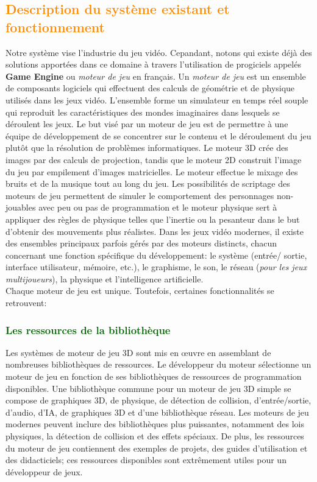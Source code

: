 \documentclass[ebook, 8pt, oneside, openany]{memoir}
\begin{document}
	\subsection{\textcolor{darkorange}{Description du système existant et fonctionnement}}
	Notre système vise l'industrie du jeu vidéo. Cepandant, notons qui existe déjà des solutions apportées
	dans ce domaine à travers l'utilisation de progiciels appelés \textbf{Game Engine} ou \emph{moteur de
	jeu} en français. Un \textit{moteur de jeu} est un ensemble de composants logiciels qui effectuent des 
	calculs de géométrie et de physique utilisés dans les jeux vidéo. L'ensemble forme un simulateur en 
	temps réel souple qui reproduit les caractéristiques des mondes imaginaires dans lesquels se déroulent 
	les jeux. Le but visé par un moteur de jeu est de permettre à une équipe de développement de se
	concentrer sur le contenu et le déroulement du jeu plutôt que la résolution de problèmes informatiques.
	Le moteur 3D crée des images par des calculs de projection, tandis que le moteur 2D construit l'image du 
	jeu par empilement d'images matricielles. Le moteur effectue le mixage des bruits et de la musique tout 
	au long du jeu. Les possibilités de scriptage des moteurs de jeu permettent de simuler le comportement
	des personnages non-jouables avec peu ou pas de programmation et le moteur physique sert à appliquer des 
	règles de physique telles que l'inertie ou la pesanteur dans le but d'obtenir des mouvements plus
	réalistes. Dans les jeux vidéo modernes, il existe des ensembles principaux parfois gérés par des 
	moteurs distincts, chacun concernant une fonction spécifique du développement: le système (entrée/
	sortie, interface utilisateur, mémoire, etc.), le graphisme, le son, le réseau (\textit{pour les jeux
	multijoueurs}), la physique et l'intelligence artificielle.\\
	Chaque moteur de jeu est unique. Toutefois, certaines fonctionnalités se retrouvent:
	\subsubsection{\textcolor{darkgreen}{Les ressources de la bibliothèque}}
	Les systèmes de moteur de jeu 3D sont mis en œuvre en assemblant de nombreuses bibliothèques de
	ressources. Le développeur du moteur sélectionne un moteur de jeu en fonction de ses bibliothèques de
	ressources de programmation disponibles. Une bibliothèque commune pour un moteur de jeu 3D simple se
	compose de graphiques 3D, de physique, de détection de collision, d'entrée/sortie, d'audio, d'IA, de
	graphiques 3D et d'une bibliothèque réseau. Les moteurs de jeu modernes peuvent inclure des
	bibliothèques plus puissantes, notamment des lois physiques, la détection de collision et des effets
	spéciaux. De plus, les ressources du moteur de jeu contiennent des exemples de projets, des guides
	d'utilisation et des didacticiels; ces ressources disponibles sont extrêmement utiles pour un
	développeur de jeux.		
\end{document}
